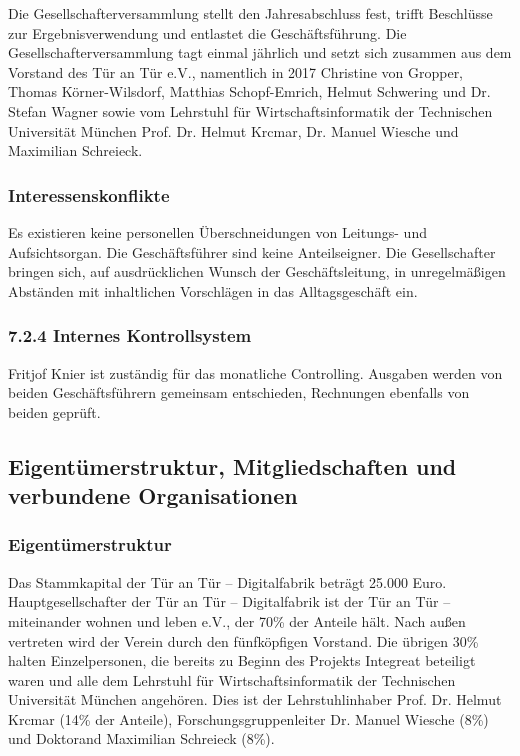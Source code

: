 \documentclass[12pt, a4paper]{article} %
\begin{document}
Die Gesellschafterversammlung stellt den Jahresabschluss fest, trifft
Beschlüsse zur Ergebnisverwendung und entlastet die Geschäftsführung.
Die Gesellschafterversammlung tagt einmal jährlich und setzt sich
zusammen aus dem Vorstand des Tür an Tür e.V., namentlich in 2017
Christine von Gropper, Thomas Körner-Wilsdorf, Matthias Schopf-Emrich,
Helmut Schwering und Dr. Stefan Wagner sowie vom Lehrstuhl für
Wirtschaftsinformatik der Technischen Universität München Prof. Dr.
Helmut Krcmar, Dr. Manuel Wiesche und Maximilian Schreieck.

\hypertarget{interessenskonflikte}{%
\subsubsection{Interessenskonflikte}\label{interessenskonflikte}}

Es existieren keine personellen Überschneidungen von Leitungs- und
Aufsichtsorgan. Die Geschäftsführer sind keine Anteilseigner. Die
Gesellschafter bringen sich, auf ausdrücklichen Wunsch der
Geschäftsleitung, in unregelmäßigen Abständen mit inhaltlichen
Vorschlägen in das Alltagsgeschäft ein.

\hypertarget{internes-kontrollsystem}{%
\subsubsection{7.2.4 Internes
Kontrollsystem}\label{internes-kontrollsystem}}

Fritjof Knier ist zuständig für das monatliche Controlling. Ausgaben
werden von beiden Geschäftsführern gemeinsam entschieden, Rechnungen
ebenfalls von beiden geprüft.

\hypertarget{eigentuxfcmerstruktur-mitgliedschaften-und-verbundene-organisationen}{%
\subsection{Eigentümerstruktur, Mitgliedschaften und verbundene
Organisationen}\label{eigentuxfcmerstruktur-mitgliedschaften-und-verbundene-organisationen}}

\hypertarget{eigentuxfcmerstruktur}{%
\subsubsection{Eigentümerstruktur}\label{eigentuxfcmerstruktur}}

Das Stammkapital der Tür an Tür – Digitalfabrik beträgt 25.000 Euro.
Hauptgesellschafter der Tür an Tür – Digitalfabrik ist der Tür an Tür –
miteinander wohnen und leben e.V., der 70\% der Anteile hält. Nach außen
vertreten wird der Verein durch den fünfköpfigen Vorstand. Die übrigen
30\% halten Einzelpersonen, die bereits zu Beginn des Projekts Integreat
beteiligt waren und alle dem Lehrstuhl für Wirtschaftsinformatik der
Technischen Universität München angehören. Dies ist der Lehrstuhlinhaber
Prof. Dr. Helmut Krcmar (14\% der Anteile), Forschungsgruppenleiter Dr.
Manuel Wiesche (8\%) und Doktorand Maximilian Schreieck (8\%).
\end{document}

